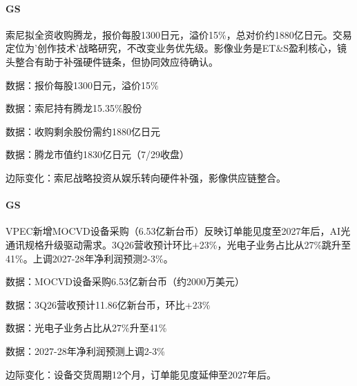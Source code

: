 \documentclass[11pt]{ctexart}
\begin{document}
\paragraph{GS} 索尼拟全资收购腾龙，报价每股1300日元，溢价15\%，总对价约1880亿日元。交易定位为'创作技术'战略研究，不改变业务优先级。影像业务是ET\&S盈利核心，镜头整合有助于补强硬件链条，但协同效应待确认。
{\small\color{refgray}数据：报价每股1300日元，溢价15\%\par}
{\small\color{refgray}数据：索尼持有腾龙15.35\%股份\par}
{\small\color{refgray}数据：收购剩余股份需约1880亿日元\par}
{\small\color{refgray}数据：腾龙市值约1830亿日元（7/29收盘）\par}
{\small\color{refgray}边际变化：索尼战略投资从娱乐转向硬件补强，影像供应链整合。\par}
\paragraph{GS} VPEC新增MOCVD设备采购（6.53亿新台币）反映订单能见度至2027年后，AI光通讯规格升级驱动需求。3Q26营收预计环比+23\%，光电子业务占比从27\%跳升至41\%。上调2027-28年净利润预测2-3\%。
{\small\color{refgray}数据：MOCVD设备采购6.53亿新台币（约2000万美元）\par}
{\small\color{refgray}数据：3Q26营收预计11.86亿新台币，环比+23\%\par}
{\small\color{refgray}数据：光电子业务占比从27\%升至41\%\par}
{\small\color{refgray}数据：2027-28年净利润预测上调2-3\%\par}
{\small\color{refgray}边际变化：设备交货周期12个月，订单能见度延伸至2027年后。\par}
\end{document}

